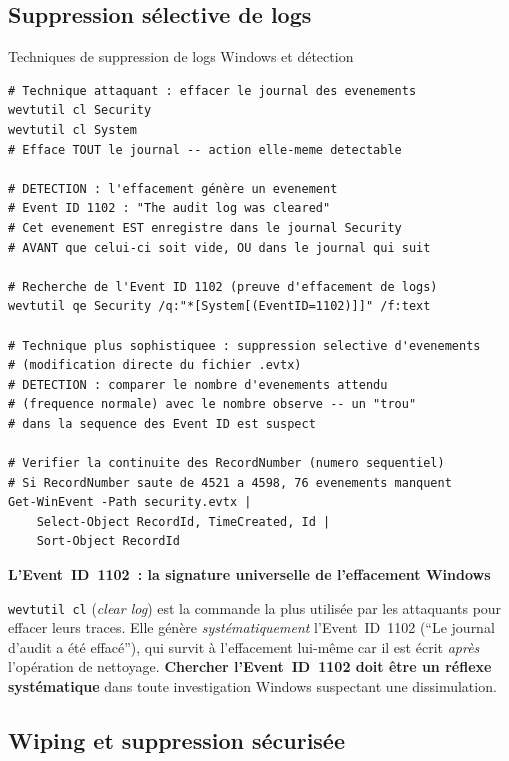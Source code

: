 \subsection{Suppression sélective de logs}

\begin{boxoutils}{Techniques de suppression de logs Windows et détection}
\begin{lstlisting}[language=bash_forensique]
# Technique attaquant : effacer le journal des evenements
wevtutil cl Security
wevtutil cl System
# Efface TOUT le journal -- action elle-meme detectable

# DETECTION : l'effacement génère un evenement
# Event ID 1102 : "The audit log was cleared"
# Cet evenement EST enregistre dans le journal Security
# AVANT que celui-ci soit vide, OU dans le journal qui suit

# Recherche de l'Event ID 1102 (preuve d'effacement de logs)
wevtutil qe Security /q:"*[System[(EventID=1102)]]" /f:text

# Technique plus sophistiquee : suppression selective d'evenements
# (modification directe du fichier .evtx)
# DETECTION : comparer le nombre d'evenements attendu
# (frequence normale) avec le nombre observe -- un "trou"
# dans la sequence des Event ID est suspect

# Verifier la continuite des RecordNumber (numero sequentiel)
# Si RecordNumber saute de 4521 a 4598, 76 evenements manquent
Get-WinEvent -Path security.evtx |
    Select-Object RecordId, TimeCreated, Id |
    Sort-Object RecordId
\end{lstlisting}
\end{boxoutils}

\begin{boxalert}
\textbf{L'Event~ID~1102~: la signature universelle de l'effacement Windows}

\texttt{wevtutil cl} (\textit{clear log}) est la commande la plus
utilisée par les attaquants pour effacer leurs traces. Elle génère
\emph{systématiquement} l'Event~ID~1102 (``Le journal d'audit a été
effacé''), qui survit à l'effacement lui-même car il est écrit
\emph{après} l'opération de nettoyage. \textbf{Chercher l'Event~ID~1102
doit être un réflexe systématique} dans toute investigation Windows
suspectant une dissimulation.
\end{boxalert}

\subsection{Wiping et suppression sécurisée}

